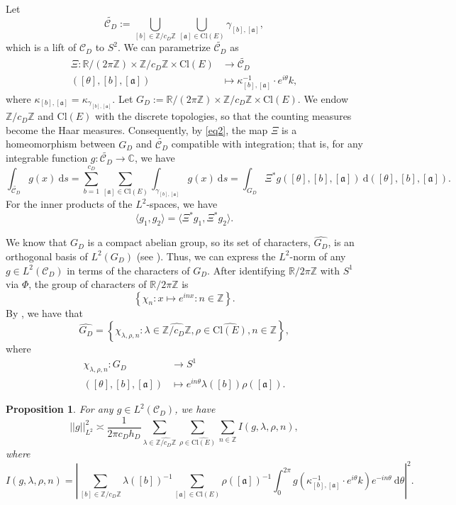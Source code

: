 \documentclass[11pt]{amsart}
\newcommand{\R}{\mathbb{R}}
\newcommand{\Z}{\mathbb{Z}}
\newcommand{\C}{\mathbb{C}}
\renewcommand{\a}{\mathfrak{a}}
\newtheorem{proposition}[theorem]{Proposition}
\theoremstyle{definition}
\theoremstyle{remark}
\begin{document}
Let $$\widetilde{\mathcal{C}_D} := \bigcup_{[b]\in \Z/c_D \Z} \bigcup_{[\a] \in \mathrm{Cl}(E)} \gamma_{[b],[\a]},$$ which is a lift of $\mathcal{C}_D$ to $S^2$. We can parametrize $\widetilde{\mathcal{C}_{D}}$ as
\begin{align*}
    \Xi: \R/(2\pi \Z) \times \Z/c_D \Z \times \mathrm{Cl}(E) &\longrightarrow \widetilde{\mathcal{C}_D} \\
    ([\theta], [b], [\a]) & \longmapsto \kappa_{[b],[\a]}^{-1} \cdot e^{i\theta}k,
\end{align*}
where $\kappa_{[b],[\a]} = \kappa_{\gamma_{[b],[\a]}}$. Let $G_D := \R/(2\pi \Z) \times \Z/c_D \Z \times \mathrm{Cl}(E)$. We endow $\Z/c_D \Z$ and $\mathrm{Cl}(E)$ with the discrete topologies, so that the counting measures become the Haar measures. Consequently, by \eqref{eq2}, the map $\Xi$ is a homeomorphism between $G_D$ and $\widetilde{\mathcal{C}_D}$ compatible with integration; that is, for any integrable function $g:\widetilde{\mathcal{C}_D} \rightarrow \C$, we have $$ \int_{\widetilde{\mathcal{C}_D}} g(x) \: \mathrm{d}s = \sum_{b=1}^{c_D} \sum_{[\a] \in \mathrm{Cl}(E)} \int_{\gamma_{[b],[\a]}} g(x) \: \mathrm{d}s = \int_{G_D} \Xi^{*}g([\theta], [b], [\a]) \: \mathrm{d}([\theta], [b], [\a]).$$ For the inner products of the $L^2$-spaces, we have
\begin{equation}
    \langle g_1, g_2\rangle  = \langle \Xi^{*} g_1, \Xi^{*} g_2\rangle. \label{InnerProdEquiv}
\end{equation}

We know that $G_D$ is a compact abelian group, so its set of characters, $\widehat{G_D}$, is an orthogonal basis of $L^2(G_D)$ (see \cite[Prop. 5.23]{FollandHarmonic}). Thus, we can express the $L^2$-norm of any $g\in L^2(\mathcal{C}_{D})$ in terms of the characters of $G_D$. After identifying $\R/2\pi\Z$ with $S^1$ via $\Phi$, the group of characters of $\R/2\pi\Z$ is $$ \left\{ \chi_n : x \mapsto e^{i nx} : n\in \Z \right\}.$$ By \cite[Cor. 4.8]{FollandHarmonic}, we have that $$ \widehat{G_D} = \left\{ \chi_{\lambda,\rho,n} : \lambda \in \widehat{\Z/c_D \Z}, \rho \in \widehat{\mathrm{Cl}(E)}, n\in \Z \right\},$$ where
\begin{align*}
    \chi_{\lambda,\rho,n} : G_D &\longrightarrow S^1\\
    ([\theta], [b], [\a]) &\longmapsto e^{in\theta} \lambda([b]) \rho([\a]).
\end{align*}

\begin{proposition}
For any $g\in L^2(\mathcal{C}_{D})$, we have
\begin{equation}
    ||g||_{L^2}^{2} \asymp \frac{1}{2\pi c_D h_D} \sum_{\lambda \in \widehat{\Z/c_D \Z}} \sum_{\rho \in \widehat{\mathrm{Cl}(E)}} \sum_{n\in \Z} I(g,\lambda, \rho, n), \label{Planch-eq1}
\end{equation}
where
\begin{equation}
    I(g,\lambda, \rho, n) = \left| \sum_{[b] \in \Z/c_D \Z} \lambda([b])^{-1} \sum_{[\a]\in \mathrm{Cl}(E)} \rho([\a])^{-1} \int_{0}^{2\pi} g\left( \kappa_{[b], [\a]}^{-1} \cdot e^{i \theta} k \right) e^{-i n\theta} \: \mathrm{d}\theta \right|^2. \label{Planch-eq2}
\end{equation}
\end{proposition}
\end{document}
